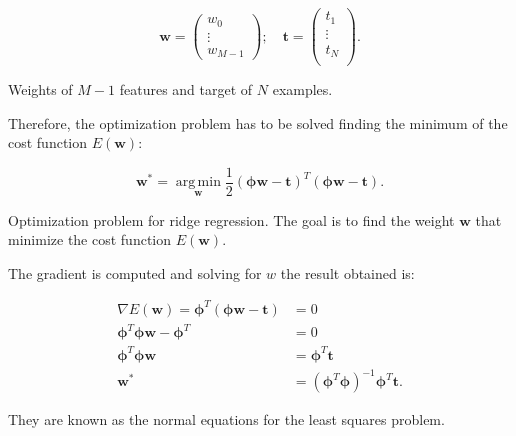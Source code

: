 \begin{Equation}[!htb]
	\centering
	\begin{equation} \label{eq:weightsandtarget}
		\bm{w} = 
		\begin{pmatrix}
			w_0 \\
			\vdots \\
			w_{M-1}
		\end{pmatrix};
		\quad \bm{t} =
		\begin{pmatrix}
			t_1 \\
			\vdots \\
			t_N \\
		\end{pmatrix}.
	\end{equation}
	\caption[Weights of M-1 features and target of N examples.]{Weights of $M-1$ features and target of $N$ examples.}
\end{Equation}

\noindent Therefore, the optimization problem has to be solved finding the minimum of the cost function $E(\bm{w})$:
\begin{Equation}[H]
	\centering
	\begin{equation} \label{eq:mincostregr}
		\bm{w^*}= \operatorname*{arg\,min}_{\bm{w}}  \frac{1}{2}(\bm{\phi} \bm{w} - \bm{t})^T (\bm{\phi} \bm{w} - \bm{t}).
	\end{equation}
	\caption[Optimization problem for ridge regression.]{Optimization problem for ridge regression. The goal is to find the weight $\bm{w}$ that minimize the cost function $E(\bm{w})$.}
\end{Equation}

\noindent The gradient is computed and solving for $w$ the result obtained is:
\begin{Equation}[H]
	\centering
	\begin{equation} \label{eq:normeq}
		\begin{aligned}
			\nabla E(\bm{w}) = \bm{\phi}^T(\bm{\phi} \bm{w} - \bm{t}) &= 0 \\
			\bm{\phi}^T \bm{\phi} \bm{w} - \bm{\phi}^T &= 0 \\
			\bm{\phi}^T \bm{\phi} \bm{w} &= \bm{\phi}^T \bm{t} \\
			\bm{w^*} &= (\bm{\phi}^T \bm{\phi})^{-1} \bm{\phi}^T \bm{t}.
		\end{aligned}
	\end{equation}
	\caption[Normal equations.]{They are known as the normal equations for the least squares problem.}
\end{Equation}

